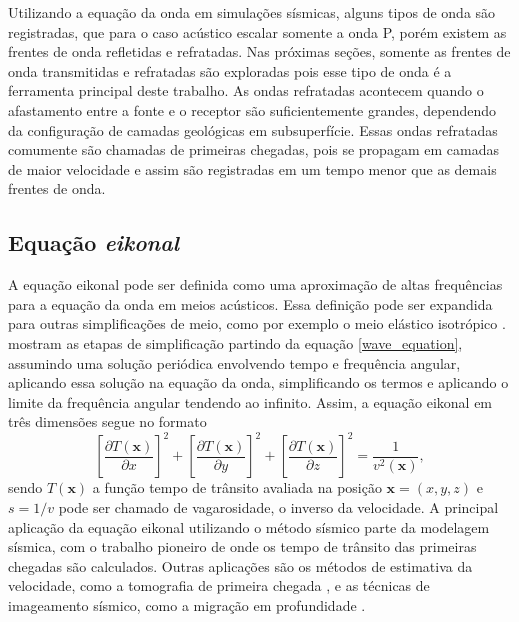 Utilizando a equação da onda em simulações sísmicas, alguns tipos de onda são registradas, que para o caso acústico escalar somente a onda P, porém existem as frentes de onda refletidas e refratadas. Nas próximas seções, somente as frentes de onda transmitidas e refratadas são exploradas pois esse tipo de onda é a ferramenta principal deste trabalho. As ondas refratadas acontecem quando o afastamento entre a fonte e o receptor são suficientemente grandes, dependendo da configuração de camadas geológicas em subsuperfície. Essas ondas refratadas comumente são chamadas de primeiras chegadas, pois se propagam em camadas de maior velocidade e assim são registradas em um tempo menor que as demais frentes de onda.          

\subsection*{Equação \textit{eikonal}}

A equação eikonal pode ser definida como uma aproximação de altas frequências para a equação da onda em meios acústicos. Essa definição pode ser expandida para outras simplificações de meio, como por exemplo o meio elástico isotrópico \cite{cerveny2003seismic}.  mostram as etapas de simplificação partindo da equação \ref{wave_equation}, assumindo uma solução periódica envolvendo tempo e frequência angular, aplicando essa solução na equação da onda, simplificando os termos e aplicando o limite da frequência angular tendendo ao infinito. Assim, a equação eikonal em três dimensões segue no formato 
\begin{equation}
	\left[\dfrac{\partial T(\mathbf{x})}{\partial x}\right]^2 + \left[\dfrac{\partial T(\mathbf{x})}{\partial y}\right]^2 + \left[\dfrac{\partial T(\mathbf{x})}{\partial z}\right]^2 = \dfrac{1}{v^2(\mathbf{x})}, 	
\end{equation} 
\noindent sendo $T(\mathbf{x})$ a função tempo de trânsito avaliada na posição $\mathbf{x} = (x,y,z)$ e $s = 1/v$ pode ser chamado de vagarosidade, o inverso da velocidade. A principal aplicação da equação eikonal utilizando o método sísmico parte da modelagem sísmica, com o trabalho pioneiro de  onde os tempo de trânsito das primeiras chegadas são calculados. Outras aplicações são os métodos de estimativa da velocidade, como a tomografia de primeira chegada \cite{zhang1998nonlinear, sei1994gradient, tromp2005seismic, taillandier2009first},  e as técnicas de imageamento sísmico, como a migração em profundidade   \cite{gray1994kirchhoff, zhang2006refraction}.  
 
